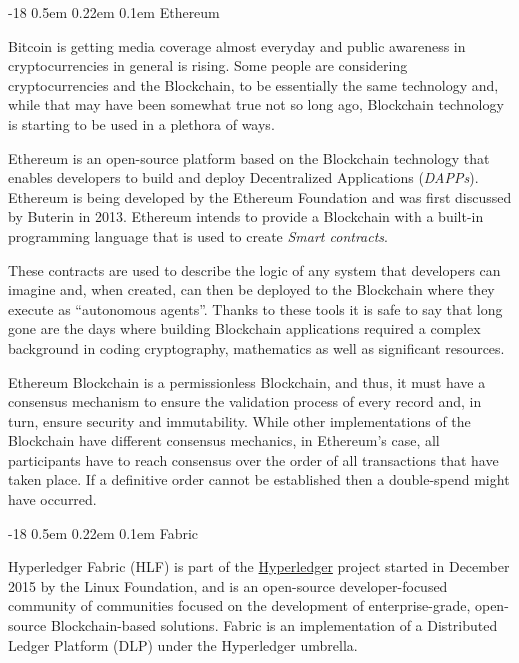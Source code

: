 \documentclass[]{llncs}
\makeatletter
\renewcommand\subsubsection{\@startsection{subsubsection}{3}{\z@}%
                       {-18\p@ \@plus -4\p@ \@minus -4\p@}%
                       {0.5em \@plus 0.22em \@minus 0.1em}%
                       {\normalfont\normalsize\bfseries\boldmath}}
\makeatother
\begin{document}
\subsubsection{Ethereum}

Bitcoin is getting media coverage almost everyday and public awareness in
cryptocurrencies in general is rising.  Some people are considering
cryptocurrencies and the Blockchain, to be essentially the same technology and,
while that may have been somewhat true not so long ago, Blockchain technology
is starting to be used in a plethora of ways.

Ethereum is an open-source platform based on the Blockchain technology that
enables developers to build and deploy Decentralized Applications
(\textit{DAPPs}).  Ethereum is being developed by the Ethereum Foundation and
was first discussed by Buterin in 2013.  Ethereum intends to provide a
Blockchain with a built-in programming language that is used to create
\textit{Smart contracts}.  \cite{Wood2017}

These contracts are used to describe the logic of any system that developers
can imagine and, when created, can then be deployed to the Blockchain where
they execute as “autonomous agents”.  Thanks to these tools it is safe to say
that long gone are the days where building Blockchain applications required a
complex background in coding cryptography, mathematics as well as significant
resources.\cite{Wood2017,BlockGeeks2017}

Ethereum Blockchain is a permissionless Blockchain, and thus, it must have a
consensus mechanism to ensure the validation process of every record and, in
turn, ensure security and immutability. While other implementations of the
Blockchain have different consensus mechanics, in Ethereum’s case, all
participants have to reach consensus over the order of all transactions that
have taken place. If a definitive order cannot be established then a
double-spend might have occurred.

\subsubsection{Fabric}

Hyperledger Fabric (HLF) is part of the
\href{http://www.hyperledger.org/projects/fabric}{Hyperledger} project started
in December 2015 by the Linux Foundation, and is an open-source
developer-focused community of communities focused on the development of
enterprise-grade, open-source Blockchain-based solutions.  Fabric is an
implementation of a Distributed Ledger Platform (DLP) under the Hyperledger
umbrella.  \cite{Cachin2016}
\end{document}
